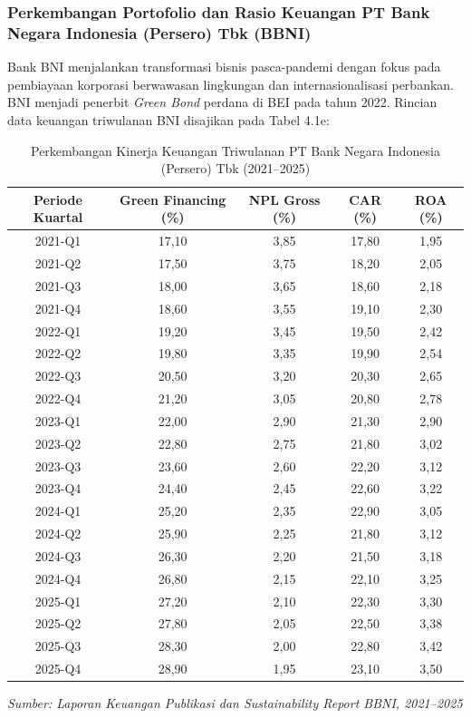\documentclass[12pt,a4paper]{article}
\numberwithin{equation}{section}
\begin{document}
\subsubsection{Perkembangan Portofolio dan Rasio Keuangan PT Bank Negara Indonesia (Persero) Tbk (BBNI)}
\noindent
Bank BNI menjalankan transformasi bisnis pasca-pandemi dengan fokus pada pembiayaan korporasi berwawasan lingkungan dan internasionalisasi perbankan. BNI menjadi penerbit \emph{Green Bond} perdana di BEI pada tahun 2022. Rincian data keuangan triwulanan BNI disajikan pada Tabel 4.1e:

\begin{table}[H]
  \caption{Perkembangan Kinerja Keuangan Triwulanan PT Bank Negara Indonesia (Persero) Tbk (2021--2025)}
  \label{tab:kinerja_bbni}
  \small
  \begin{tabularx}{\textwidth}{|c|c|c|c|c|}
    \hline
    \textbf{Periode Kuartal} & \textbf{Green Financing (\%)} & \textbf{NPL Gross (\%)} & \textbf{CAR (\%)} & \textbf{ROA (\%)} \\
    \hline
    2021-Q1 & 17,10 & 3,85 & 17,80 & 1,95 \\
    2021-Q2 & 17,50 & 3,75 & 18,20 & 2,05 \\
    2021-Q3 & 18,00 & 3,65 & 18,60 & 2,18 \\
    2021-Q4 & 18,60 & 3,55 & 19,10 & 2,30 \\
    \hline
    2022-Q1 & 19,20 & 3,45 & 19,50 & 2,42 \\
    2022-Q2 & 19,80 & 3,35 & 19,90 & 2,54 \\
    2022-Q3 & 20,50 & 3,20 & 20,30 & 2,65 \\
    2022-Q4 & 21,20 & 3,05 & 20,80 & 2,78 \\
    \hline
    2023-Q1 & 22,00 & 2,90 & 21,30 & 2,90 \\
    2023-Q2 & 22,80 & 2,75 & 21,80 & 3,02 \\
    2023-Q3 & 23,60 & 2,60 & 22,20 & 3,12 \\
    2023-Q4 & 24,40 & 2,45 & 22,60 & 3,22 \\
    \hline
    2024-Q1 & 25,20 & 2,35 & 22,90 & 3,05 \\
    2024-Q2 & 25,90 & 2,25 & 21,80 & 3,12 \\
    2024-Q3 & 26,30 & 2,20 & 21,50 & 3,18 \\
    2024-Q4 & 26,80 & 2,15 & 22,10 & 3,25 \\
    \hline
    2025-Q1 & 27,20 & 2,10 & 22,30 & 3,30 \\
    2025-Q2 & 27,80 & 2,05 & 22,50 & 3,38 \\
    2025-Q3 & 28,30 & 2,00 & 22,80 & 3,42 \\
    2025-Q4 & 28,90 & 1,95 & 23,10 & 3,50 \\
    \hline
  \end{tabularx}
  \begin{flushleft}
    \textit{Sumber: Laporan Keuangan Publikasi dan Sustainability Report BBNI, 2021--2025}
  \end{flushleft}
\end{table}
\end{document}
